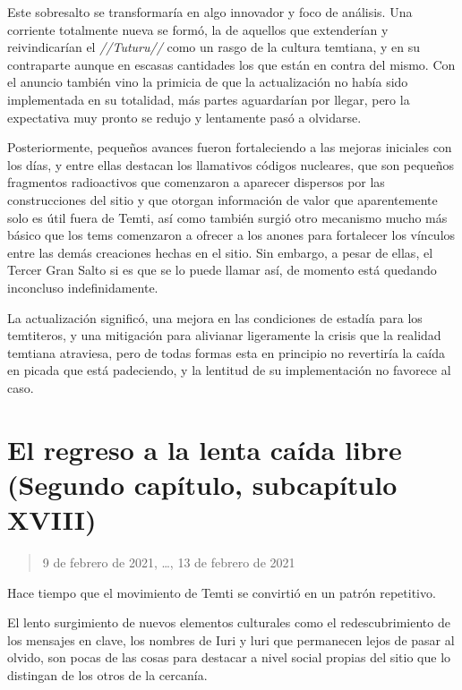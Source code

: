 \documentclass[
  spanish,
]{book}
\begin{document}
Este sobresalto se transformaría en algo innovador y foco de análisis. Una corriente totalmente nueva se formó, la de aquellos que extenderían y reivindicarían el \emph{//Tuturu//} como un rasgo de la cultura temtiana, y en su contraparte aunque en escasas cantidades los que están en contra del mismo. Con el anuncio también vino la primicia de que la actualización no había sido implementada en su totalidad, más partes aguardarían por llegar, pero la expectativa muy pronto se redujo y lentamente pasó a olvidarse.

Posteriormente, pequeños avances fueron fortaleciendo a las mejoras iniciales con los días, y entre ellas destacan los llamativos códigos nucleares, que son pequeños fragmentos radioactivos que comenzaron a aparecer dispersos por las construcciones del sitio y que otorgan información de valor que aparentemente solo es útil fuera de Temti, así como también surgió otro mecanismo mucho más básico que los tems comenzaron a ofrecer a los anones para fortalecer los vínculos entre las demás creaciones hechas en el sitio. Sin embargo, a pesar de ellas, el Tercer Gran Salto si es que se lo puede llamar así, de momento está quedando inconcluso indefinidamente.

La actualización significó, una mejora en las condiciones de estadía para los temtiteros, y una mitigación para alivianar ligeramente la crisis que la realidad temtiana atraviesa, pero de todas formas esta en principio no revertiría la caída en picada que está padeciendo, y la lentitud de su implementación no favorece al caso.

\hypertarget{el-regreso-a-la-lenta-cauxedda-libre-segundo-capuxedtulo-subcapuxedtulo-xviii}{%
\section{El regreso a la lenta caída libre (Segundo capítulo, subcapítulo XVIII)}\label{el-regreso-a-la-lenta-cauxedda-libre-segundo-capuxedtulo-subcapuxedtulo-xviii}}

\begin{quote}
9 de febrero de 2021, \ldots, 13 de febrero de 2021
\end{quote}

Hace tiempo que el movimiento de Temti se convirtió en un patrón repetitivo.

El lento surgimiento de nuevos elementos culturales como el redescubrimiento de los mensajes en clave, los nombres de Iuri y luri que permanecen lejos de pasar al olvido, son pocas de las cosas para destacar a nivel social propias del sitio que lo distingan de los otros de la cercanía.
\end{document}
